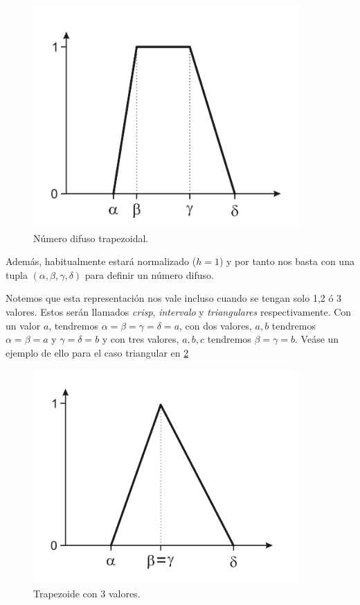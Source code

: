 \begin{figure}[h]
  \centering
  \includegraphics[width=0.9\textwidth]{gfx/trapezoid.png}
  \caption{\label{fig:trapezoid}Número difuso trapezoidal.}
\end{figure}

Además, habitualmente estará normalizado ($h=1$) y por tanto nos basta con una tupla $(\alpha, \beta, \gamma, \delta)$ para definir un número difuso.

\begin{remark}\label{notaciontrapezoide}
Notemos que esta representación nos vale incluso cuando se tengan solo 1,2 ó 3 valores. Estos serán llamados \textit{crisp}, \textit{intervalo} y \textit{triangulares} respectivamente. Con un valor $a$, tendremos $\alpha = \beta = \gamma = \delta = a$, con dos valores, $a,b$ tendremos $\alpha = \beta = a$ y $\gamma = \delta = b$ y con tres valores, $a,b,c$ tendremos $\beta = \gamma = b$. Veáse un ejemplo de ello para el caso triangular en \ref{fig:trapezoid3}
\end{remark}

\begin{figure}[h]
  \centering
  \includegraphics[width=0.9\textwidth]{gfx/trapezoid3.png}
  \caption{\label{fig:trapezoid3}Trapezoide con 3 valores.}
\end{figure}

